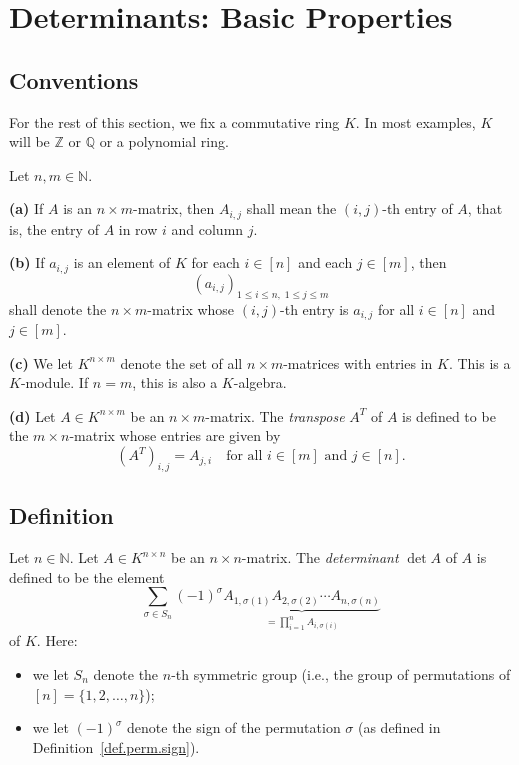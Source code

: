 \section{Determinants: Basic Properties}

\subsection{Conventions}

\begin{convention}
\label{conv.det.K}
For the rest of this section, we fix a commutative ring $K$.
In most examples, $K$ will be $\mathbb{Z}$ or $\mathbb{Q}$ or a polynomial ring.
\end{convention}

\begin{convention}
\label{conv.det.matrices}
Let $n, m \in \mathbb{N}$.

\textbf{(a)} If $A$ is an $n \times m$-matrix, then $A_{i,j}$ shall mean the
$(i,j)$-th entry of $A$, that is, the entry of $A$ in row $i$ and column $j$.

\textbf{(b)} If $a_{i,j}$ is an element of $K$ for each $i \in [n]$ and each
$j \in [m]$, then
\[
  \left( a_{i,j} \right)_{1 \leq i \leq n,\; 1 \leq j \leq m}
\]
shall denote the $n \times m$-matrix whose $(i,j)$-th entry is $a_{i,j}$ for
all $i \in [n]$ and $j \in [m]$.

\textbf{(c)} We let $K^{n \times m}$ denote the set of all $n \times m$-matrices
with entries in $K$. This is a $K$-module. If $n = m$, this is also a $K$-algebra.

\textbf{(d)} Let $A \in K^{n \times m}$ be an $n \times m$-matrix. The
\emph{transpose} $A^T$ of $A$ is defined to be the $m \times n$-matrix whose
entries are given by
\[
  \left( A^T \right)_{i,j} = A_{j,i}
  \quad \text{for all } i \in [m] \text{ and } j \in [n].
\]
\end{convention}

\subsection{Definition}

\begin{definition}
\label{def.det.det}
\leantarget
\leanok
Let $n \in \mathbb{N}$. Let $A \in K^{n \times n}$ be an $n \times n$-matrix.
The \emph{determinant} $\det A$ of $A$ is defined to be the element
\[
  \sum_{\sigma \in S_n} (-1)^{\sigma}
  \underbrace{A_{1,\sigma(1)} A_{2,\sigma(2)} \cdots A_{n,\sigma(n)}}_{
    = \prod_{i=1}^{n} A_{i,\sigma(i)}}
\]
of $K$. Here:
\begin{itemize}
\item we let $S_n$ denote the $n$-th symmetric group (i.e., the group of
permutations of $[n] = \{1, 2, \ldots, n\}$);
\item we let $(-1)^{\sigma}$ denote the sign of the permutation $\sigma$
(as defined in Definition~\ref{def.perm.sign}).
\end{itemize}
\end{definition}

